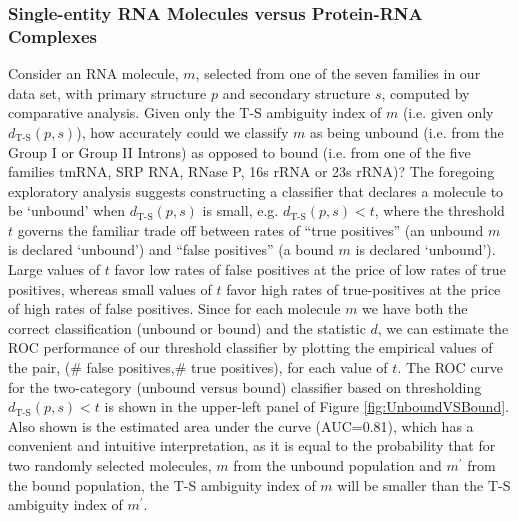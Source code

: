 \documentclass[10pt,letterpaper]{article}
\begin{document}
\subsubsection*{Single-entity RNA Molecules versus Protein-RNA Complexes}
Consider an RNA molecule, $m$, selected from one of the seven families in our data set, with primary structure $p$ and secondary structure $s$, computed by comparative analysis.
Given only the T-S ambiguity index of $m$ (i.e. given only $d_\text{T-S}(p,s)$), 
how accurately could we classify $m$ as being unbound (i.e. from the Group I or Group II Introns) as opposed to bound (i.e. from one of the five families tmRNA, SRP RNA, RNase P, 16s rRNA or 23s rRNA)? 
The foregoing exploratory analysis suggests constructing a classifier that declares a molecule to be `unbound' when $d_\text{T-S}(p,s)$ is small, e.g. $d_\text{T-S}(p,s)<t$, where the threshold $t$ governs the familiar trade off between rates of ``true positives'' (an unbound $m$ is declared `unbound') and ``false positives'' (a bound $m$ is declared `unbound').
Large values of $t$ favor low rates of false positives at the price of low rates of true positives, whereas small values of $t$ favor high rates of true-positives at the price of high rates of false positives. Since for each molecule $m$ we have both the correct classification (unbound or bound) and the statistic $d$, we can estimate the ROC performance of our threshold classifier by plotting the empirical values of the pair, (\# false positives,\# true positives), for each value of $t$. The ROC curve for the two-category (unbound versus bound) classifier based on thresholding $d_\text{T-S}(p,s)<t$ is shown in the upper-left panel of Figure \ref{fig:UnboundVSBound}.
Also shown is the estimated area under the curve (AUC=0.81), which has a convenient and intuitive interpretation, as it is equal to the probability that for two randomly selected molecules, $m$ from the unbound population and $m^\prime$ from the bound population, the T-S ambiguity index of $m$ will be smaller than the T-S ambiguity index of $m^\prime$. 


\end{document}
